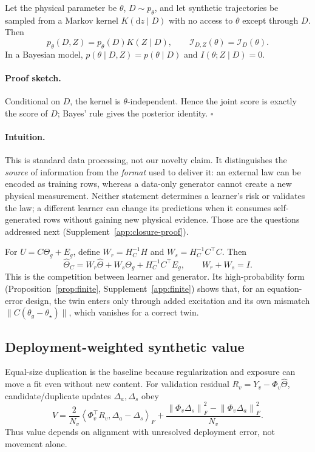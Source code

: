 \documentclass{l4dc2027}
\newcommand{\norm}[1]{\left\lVert #1\right\rVert}
\newcommand{\ip}[2]{\left\langle #1,#2\right\rangle}
\newcommand{\hTh}{\widehat\Theta}
\newcommand{\ProofSketch}{\paragraph{Proof sketch.}}
\newcommand{\Intuition}{\paragraph{Intuition.}}
\begin{document}
\begin{proposition}\label{thm:closure}
Let the physical parameter be $\theta$, $D\sim p_\theta$, and let synthetic trajectories be sampled from a Markov kernel $K(\mathrm dz\mid D)$ with no access to $\theta$ except through $D$. Then
\begin{equation}\label{eq:closure}
p_\theta(D,Z)=p_\theta(D)K(Z\mid D),\qquad \mathcal I_{D,Z}(\theta)=\mathcal I_D(\theta).
\end{equation}
In a Bayesian model, $p(\theta\mid D,Z)=p(\theta\mid D)$ and $I(\theta;Z\mid D)=0$.
\end{proposition}
\ProofSketch Conditional on $D$, the kernel is $\theta$-independent. Hence the joint score is exactly the score of $D$; Bayes' rule gives the posterior identity. \hfill$\square$
\Intuition This is standard data processing, not our novelty claim. It distinguishes the \emph{source} of information from the \emph{format} used to deliver it: an external law can be encoded as training rows, whereas a data-only generator cannot create a new physical measurement. Neither statement determines a learner's risk or validates the law; a different learner can change its predictions when it consumes self-generated rows without gaining new physical evidence. Those are the questions addressed next (Supplement~\ref{app:closure-proof}).

For $U=C\Theta_g+E_g$, define $W_r=H_C^{-1}H$ and $W_s=H_C^{-1}C^\top C$. Then
\begin{equation}\label{eq:pull}
\hTh_C=W_r\hTh+W_s\Theta_g+H_C^{-1}C^\top E_g,\qquad W_r+W_s=I.
\end{equation}
This is the competition between learner and generator. Its high-probability form (Proposition~\ref{prop:finite}, Supplement~\ref{app:finite}) shows that, for an equation-error design, the twin enters only through added excitation and its own mismatch $\|C(\theta_g-\theta_\star)\|$, which vanishes for a correct twin.

\subsection{Deployment-weighted synthetic value}
Equal-size duplication is the baseline because regularization and exposure can move a fit even without new content. For validation residual $R_v=Y_v-\Phi_v\hTh$, candidate/duplicate updates $\Delta_a,\Delta_s$ obey
\begin{equation}\label{eq:value}
V=\frac{2}{N_v}\ip{\Phi_v^\top R_v}{\Delta_a-\Delta_s}_F+
\frac{\norm{\Phi_v\Delta_s}_F^2-\norm{\Phi_v\Delta_a}_F^2}{N_v}.
\end{equation}
Thus value depends on alignment with unresolved deployment error, not movement alone.
\end{document}
